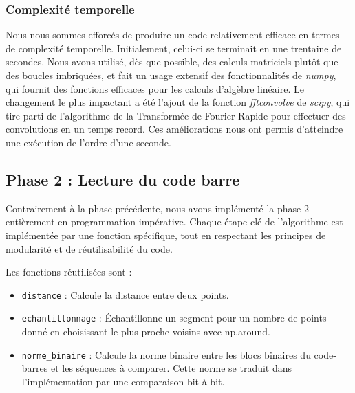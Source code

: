\documentclass{rapport}
\begin{document}
\subsubsection*{Complexité temporelle}
Nous nous sommes efforcés de produire un code relativement efficace en termes de complexité temporelle.\newline
Initialement, celui-ci se terminait en une trentaine de secondes. 
Nous avons utilisé, dès que possible, des calculs matriciels plutôt que des boucles imbriquées, et fait un usage extensif des fonctionnalités de \textit{numpy}, qui fournit des fonctions efficaces pour les calculs d'algèbre linéaire. Le changement le plus impactant a été l'ajout de la fonction \textit{fftconvolve} de \textit{scipy}, qui tire parti de l'algorithme de la Transformée de Fourier Rapide pour effectuer des convolutions en un temps record.
\newline Ces améliorations nous ont permis d'atteindre une exécution de l'ordre d'une seconde.

\subsection{Phase 2 : Lecture du code barre}

Contrairement à la phase précédente, nous avons implémenté la phase 2 entièrement en programmation impérative.
Chaque étape clé de l'algorithme est implémentée par une fonction spécifique, tout en respectant les principes de modularité et de réutilisabilité du code.

\vspace{0.5cm}

Les fonctions réutilisées sont : 
\begin{itemize}
	\item \texttt{distance} : Calcule la distance entre deux points.
	\item \texttt{echantillonnage} : Échantillonne un segment pour un nombre de points donné en choisissant le plus proche voisins avec np.around.
	\item \texttt{norme\_binaire} : Calcule la norme binaire entre les blocs binaires du code-barres et les séquences à comparer. Cette norme se traduit dans l'implémentation par une comparaison bit à bit.
\end{itemize}
\end{document}
